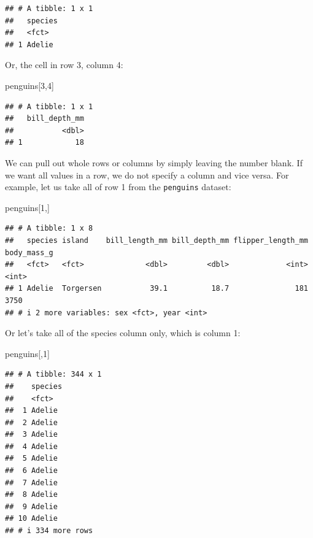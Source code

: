 \documentclass[
]{book}
\newenvironment{Shaded}{\begin{snugshade}}{\end{snugshade}}
\newcommand{\DecValTok}[1]{\textcolor[rgb]{0.00,0.00,0.81}{#1}}
\newcommand{\NormalTok}[1]{#1}
\begin{document}
\begin{verbatim}
## # A tibble: 1 x 1
##   species
##   <fct>  
## 1 Adelie
\end{verbatim}

Or, the cell in row 3, column 4:

\begin{Shaded}
\begin{Highlighting}[]
\NormalTok{penguins[}\DecValTok{3}\NormalTok{,}\DecValTok{4}\NormalTok{]}
\end{Highlighting}
\end{Shaded}

\begin{verbatim}
## # A tibble: 1 x 1
##   bill_depth_mm
##           <dbl>
## 1            18
\end{verbatim}

We can pull out whole rows or columns by simply leaving the number blank. If we want all values in a row, we do not specify a column and vice versa. For example, let us take all of row 1 from the \texttt{penguins} dataset:

\begin{Shaded}
\begin{Highlighting}[]
\NormalTok{penguins[}\DecValTok{1}\NormalTok{,]}
\end{Highlighting}
\end{Shaded}

\begin{verbatim}
## # A tibble: 1 x 8
##   species island    bill_length_mm bill_depth_mm flipper_length_mm body_mass_g
##   <fct>   <fct>              <dbl>         <dbl>             <int>       <int>
## 1 Adelie  Torgersen           39.1          18.7               181        3750
## # i 2 more variables: sex <fct>, year <int>
\end{verbatim}

Or let's take all of the species column only, which is column 1:

\begin{Shaded}
\begin{Highlighting}[]
\NormalTok{penguins[,}\DecValTok{1}\NormalTok{]}
\end{Highlighting}
\end{Shaded}

\begin{verbatim}
## # A tibble: 344 x 1
##    species
##    <fct>  
##  1 Adelie 
##  2 Adelie 
##  3 Adelie 
##  4 Adelie 
##  5 Adelie 
##  6 Adelie 
##  7 Adelie 
##  8 Adelie 
##  9 Adelie 
## 10 Adelie 
## # i 334 more rows
\end{verbatim}
\end{document}
